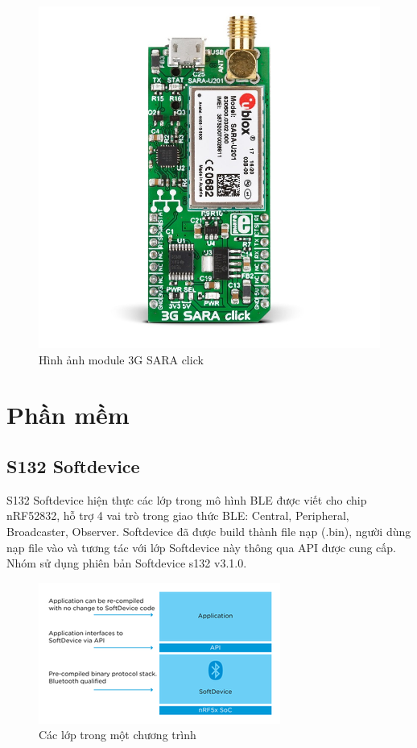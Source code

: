     \begin{figure}[h!]
    	\begin{center}
    		\includegraphics[scale=0.2, angle=90]{images/3g-sara-click.jpg}
    		\caption{Hình ảnh module 3G SARA click}
    	\end{center}
    \end{figure}
    \section{Phần mềm}
            \subsection{S132 Softdevice}
        S132 Softdevice hiện thực các lớp trong mô hình BLE được viết cho chip nRF52832, hỗ trợ 4 vai trò trong giao thức BLE: Central, Peripheral, Broadcaster, Observer. Softdevice đã được build thành file nạp (.bin), người dùng nạp file vào và tương tác với lớp Softdevice này thông qua API được cung cấp. Nhóm sử dụng phiên bản Softdevice s132 v3.1.0\cite{softdevice}.
        \begin{figure}[h!]
        	\begin{center}
        		\includegraphics[scale=3.0]{images/SoC-Architecture_large.png}
        		\caption{Các lớp trong một chương trình}
        	\end{center}
        \end{figure}
